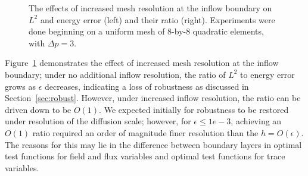 \documentclass[11pt,onecolumn]{scrartcl}
\begin{document}
\begin{figure}[!h]
\centering
{}
\caption{The effects of increased mesh resolution at the inflow boundary on $L^2$ and energy error (left) and their ratio (right).  Experiments were done beginning on a uniform mesh of 8-by-8 quadratic elements, with $\Delta p = 3$.}
\label{fig:robustness}
\end{figure}

Figure~\ref{fig:robustness} demonstrates the effect of increased mesh resolution at the inflow boundary; under no additional inflow resolution, the ratio of $L^2$ to energy error grows as $\epsilon$ decreases, indicating a loss of robustness as discussed in Section~\ref{sec:robust}.  However, under increased inflow resolution, the ratio can be driven down to be $O(1)$.  We expected initially for robustness to be restored under resolution of the diffusion scale; however, for $\epsilon \leq 1e-3$, achieving an $O(1)$ ratio required an order of magnitude finer resolution than the $h = O(\epsilon)$.  The reasons for this may lie in the difference between boundary layers in optimal test functions for field and flux variables and optimal test functions for trace variables.
\end{document}
